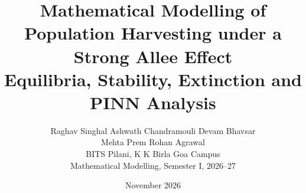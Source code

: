 \documentclass[12pt,a4paper]{article}
\title{Mathematical Modelling of Population Harvesting under a Strong Allee Effect\\[0.4em]
\large Equilibria, Stability, Extinction and PINN Analysis}
\author{Raghav Singhal \quad Ashwath Chandramouli \quad Devam Bhavsar\\
Mehta Prem \quad Rohan Agrawal\\[0.5em]
\small BITS Pilani, K K Birla Goa Campus\\
\small Mathematical Modelling, Semester I, 2026--27}
\date{November 2026}
\begin{document}
\maketitle



\FloatBarrier

\FloatBarrier

\FloatBarrier

\FloatBarrier

\FloatBarrier




% 
\end{document}
